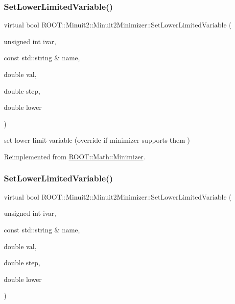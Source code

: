 \subsubsection{\texorpdfstring{SetLowerLimitedVariable()}{SetLowerLimitedVariable()}\hspace{0.1cm}{\footnotesize\ttfamily [2/3]}}
{\footnotesize\ttfamily virtual bool R\+O\+O\+T\+::\+Minuit2\+::\+Minuit2\+Minimizer\+::\+Set\+Lower\+Limited\+Variable (\begin{DoxyParamCaption}\item[{unsigned int}]{ivar,  }\item[{const std\+::string \&}]{name,  }\item[{double}]{val,  }\item[{double}]{step,  }\item[{double}]{lower }\end{DoxyParamCaption})\hspace{0.3cm}{\ttfamily [virtual]}}



set lower limit variable (override if minimizer supports them ) 



Reimplemented from \mbox{\hyperlink{classROOT_1_1Math_1_1Minimizer_a0fed20bdc58d05ce2b92d2bf47594dfb}{R\+O\+O\+T\+::\+Math\+::\+Minimizer}}.

\mbox{\label{classROOT_1_1Minuit2_1_1Minuit2Minimizer_af38926946e36f7030cfc1c298ab9b222}} 
\subsubsection{\texorpdfstring{SetLowerLimitedVariable()}{SetLowerLimitedVariable()}\hspace{0.1cm}{\footnotesize\ttfamily [3/3]}}
{\footnotesize\ttfamily virtual bool R\+O\+O\+T\+::\+Minuit2\+::\+Minuit2\+Minimizer\+::\+Set\+Lower\+Limited\+Variable (\begin{DoxyParamCaption}\item[{unsigned int}]{ivar,  }\item[{const std\+::string \&}]{name,  }\item[{double}]{val,  }\item[{double}]{step,  }\item[{double}]{lower }\end{DoxyParamCaption})\hspace{0.3cm}{\ttfamily [virtual]}}



